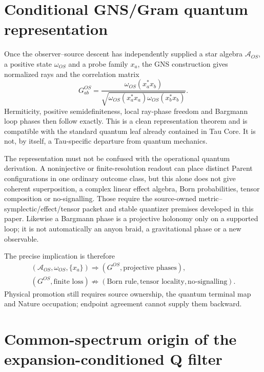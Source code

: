 \documentclass[11pt]{article}
\begin{document}
\section{Conditional GNS/Gram quantum representation}

Once the observer--source descent has independently supplied a star algebra
$\mathcal A_{OS}$, a positive state $\omega_{OS}$ and a probe family $x_a$,
the GNS construction gives normalized rays and the correlation matrix
\begin{equation}
 G^{OS}_{ab}=
 \frac{\omega_{OS}(x_a^*x_b)}
 {\sqrt{\omega_{OS}(x_a^*x_a)\omega_{OS}(x_b^*x_b)}}.
 \label{eq:paperVI-gns-gram}
\end{equation}
Hermiticity, positive semidefiniteness, local ray-phase freedom and Bargmann
loop phases then follow exactly.  This is a clean representation theorem and
is compatible with the standard quantum leaf already contained in Tau Core.
It is not, by itself, a Tau-specific departure from quantum mechanics.

The representation must not be confused with the operational quantum
derivation.  A noninjective or finite-resolution readout can place distinct
Parent configurations in one ordinary outcome class, but this alone does not
give coherent superposition, a complex linear effect algebra, Born
probabilities, tensor composition or no-signalling.  Those require the
source-owned metric--symplectic/effect/tensor packet and stable quantizer
premises developed in this paper.  Likewise a Bargmann phase is a projective
holonomy only on a supported loop; it is not automatically an anyon braid,
a gravitational phase or a new observable.

The precise implication is therefore
\begin{equation}
 \begin{gathered}
 (\mathcal A_{OS},\omega_{OS},\{x_a\})
 \Longrightarrow
 (G^{OS},\text{projective phases}),\\
 (G^{OS},\text{finite loss})
 \not\Longrightarrow
 (\text{Born rule},\text{tensor locality},\text{no-signalling}).
 \end{gathered}
 \label{eq:paperVI-gram-boundary}
\end{equation}
Physical promotion still requires source ownership, the quantum terminal
map and Nature occupation; endpoint agreement cannot supply them backward.

\section{Common-spectrum origin of the expansion-conditioned Q filter}
\end{document}
